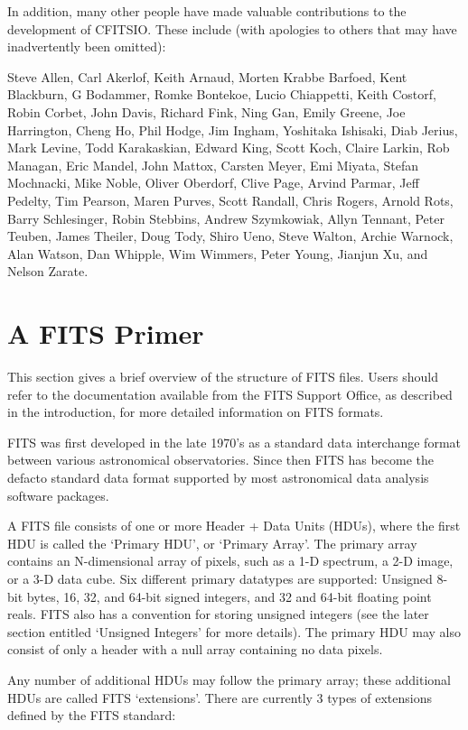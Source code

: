 \documentclass[11pt]{book}
\begin{document}
In addition, many other people have made valuable contributions to the
development of CFITSIO.  These include (with apologies to others that may
have inadvertently been omitted):

Steve Allen, Carl Akerlof, Keith Arnaud, Morten Krabbe Barfoed, Kent
Blackburn, G Bodammer, Romke Bontekoe, Lucio Chiappetti, Keith Costorf,
Robin Corbet, John Davis,  Richard Fink, Ning Gan, Emily Greene, Joe
Harrington, Cheng Ho, Phil Hodge, Jim Ingham, Yoshitaka Ishisaki, Diab
Jerius, Mark Levine, Todd Karakaskian, Edward King, Scott Koch,  Claire
Larkin, Rob Managan, Eric Mandel, John Mattox, Carsten Meyer, Emi
Miyata, Stefan Mochnacki, Mike Noble, Oliver Oberdorf, Clive Page,
Arvind Parmar, Jeff Pedelty, Tim Pearson, Maren Purves, Scott Randall,
Chris Rogers, Arnold Rots, Barry Schlesinger, Robin Stebbins, Andrew
Szymkowiak, Allyn Tennant, Peter Teuben, James Theiler, Doug Tody,
Shiro Ueno, Steve Walton, Archie Warnock, Alan Watson, Dan Whipple, Wim
Wimmers, Peter Young, Jianjun Xu, and Nelson Zarate.


\chapter{  A FITS Primer }

This section gives a brief overview of the structure of FITS files.
Users should refer to the documentation available from the FITS Support Office, as
described in the introduction, for more detailed information on FITS
formats.

FITS was first developed in the late 1970's as a standard data
interchange format between various astronomical observatories.  Since
then FITS has become the defacto standard data format supported by most
astronomical data analysis software packages.

A FITS file consists of one or more Header + Data Units (HDUs), where
the first HDU is called the `Primary HDU', or `Primary Array'.  The
primary array contains an N-dimensional array of pixels, such as a 1-D
spectrum, a 2-D image, or a 3-D data cube.  Six different primary
datatypes are supported: Unsigned 8-bit bytes, 16, 32, and 64-bit signed
integers, and 32 and 64-bit floating point reals.  FITS also has a
convention for storing unsigned integers (see the later
section entitled `Unsigned Integers' for more details). The primary HDU
may also consist of only a header with a null array containing no
data pixels.

Any number of additional HDUs may follow the primary array; these
additional HDUs are called FITS `extensions'.  There are currently 3
types of extensions defined by the FITS standard:
\end{document}
